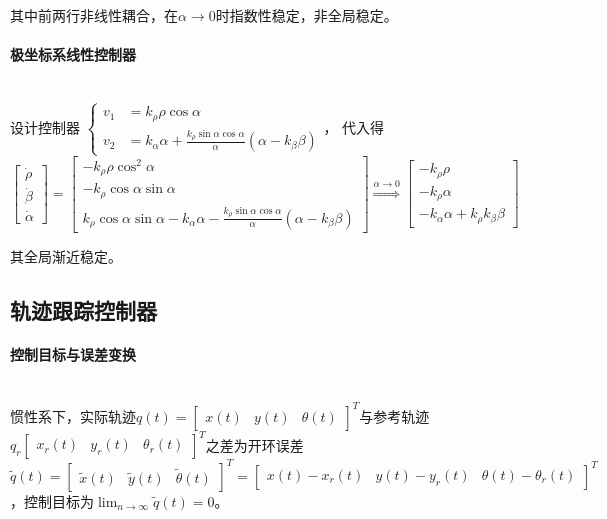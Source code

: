 \documentclass[
12pt, %
a4paper, 
oneside, %
headinclude,footinclude, %
]{scrartcl}
\begin{document}
其中前两行非线性耦合，在$ \alpha \to 0 $时指数性稳定，非全局稳定。
\paragraph{极坐标系线性控制器}~\\

设计控制器%
$
\begin{cases}
v_1 &= k_\rho \rho \cos\alpha \\
v_2 &= k_\alpha \alpha + \frac{k_\rho \sin \alpha \cos\alpha}{\alpha}(\alpha - k_\beta\beta)
\end{cases}
$，%
代入得
$$ 
\begin{bmatrix} \dot{\rho} \\ \dot{\beta} \\ \dot{\alpha} \end{bmatrix} 
= \begin{bmatrix} -k_\rho \rho \cos^2\alpha \\ -k_\rho \cos\alpha \sin\alpha \\ k_\rho \cos\alpha \sin\alpha - k_\alpha \alpha - \frac{k_\rho \sin\alpha \cos\alpha}{\alpha} (\alpha - k_\beta\beta) \end{bmatrix} 
\overset{\alpha \to 0}{\Longrightarrow}
\begin{bmatrix} -k_\rho \rho \\ -k_\rho \alpha \\ - k_\alpha \alpha + k_\rho k_\beta\beta \end{bmatrix} 
$$

其全局渐近稳定。
\subsection[轨迹跟踪控制器]{轨迹跟踪控制器}
\paragraph{控制目标与误差变换}~\\

惯性系下，实际轨迹$ q(t) = \begin{bmatrix} x(t) & y(t) & \theta(t) \end{bmatrix}^T $与参考轨迹$ q_r \begin{bmatrix} x_r(t) & y_r(t) & \theta_r(t) \end{bmatrix}^T $之差为开环误差$ \tilde{q}(t) = \begin{bmatrix} \tilde{x}(t) & \tilde{y}(t) & \tilde{\theta}(t) \end{bmatrix}^T = \begin{bmatrix} x(t) - x_r(t) & y(t) - y_r(t) & \theta(t) - \theta_r(t) \end{bmatrix}^T $，控制目标为$ \lim_{n \to \infty} \tilde{q}(t) = 0 $。
\end{document}
